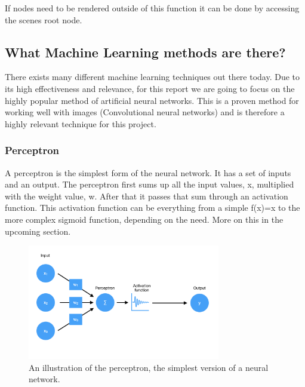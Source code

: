 If nodes need to be rendered outside of this function it can be done by accessing the
scenes root node.



\subsection{What Machine Learning methods are there?}
There exists many different machine learning techniques out there today. Due to its high effectiveness and relevance, for this report we are going to focus on the highly popular method of artificial neural networks.
This is a proven method for working well with images (Convolutional neural networks) and is therefore a highly 
relevant technique for this project.

\subsubsection{Perceptron}
A perceptron is the simplest form of the neural network. It has a set of inputs and an output.
The perceptron first sums up all the input values, x, multiplied with the weight value, w.
After that it passes that sum through an activation function. This activation function can be everything from a simple f(x)=x to the more complex sigmoid function, depending on the need. More on this in the upcoming section.

\begin{figure}[hbtp]
\begin{center}
\includegraphics[width = 0.75\textwidth]{./Images/perceptron.jpg} 
\caption{An illustration of the perceptron, the simplest version of a neural network.}
\end{center}
\end{figure}

